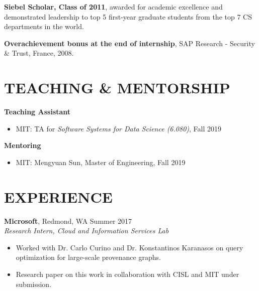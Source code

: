 \documentclass[line,margin]{res}
\begin{document}
\begin{resume}
\textbf{Siebel Scholar, Class of 2011}, awarded for academic excellence and demonstrated leadership to top 5 first-year graduate students from the top 7 CS departments in the world.

\textbf{Overachievement bonus at the end of internship}, SAP Research - Security \& Trust, France, 2008.




\section{TEACHING \& MENTORSHIP}
  \textbf{Teaching Assistant} \\
  \begin{itemize}
    \item MIT: TA for {\sl Software Systems for Data Science (6.080)}, Fall 2019
  \end{itemize}

  \textbf{Mentoring} \\
  \begin{itemize}
    \item MIT: Mengyuan Sun, Master of Engineering, Fall 2019
  \end{itemize}

\section{EXPERIENCE}
  \textbf{Microsoft}, Redmond, WA \hfill Summer 2017 \\
  {\sl Research Intern, Cloud and Information Services Lab}
  \begin{itemize}
  \item Worked with Dr. Carlo Curino and Dr. Konstantinos Karanasos on query optimization for large-scale provenance graphs.
  \item Research paper on this work in collaboration with CISL and MIT under submission.
  \end{itemize}


\end{resume}
\end{document}
